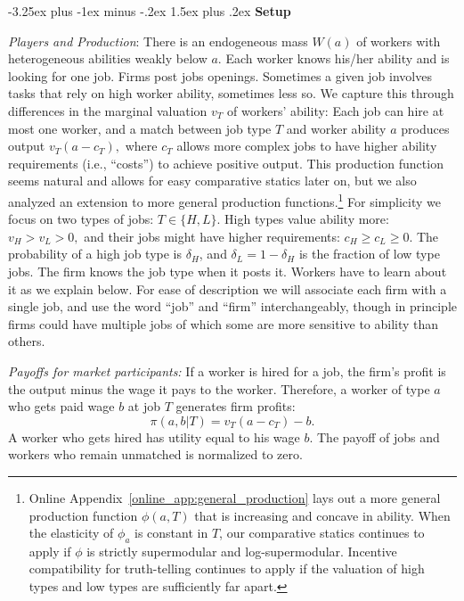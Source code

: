 \documentclass[12pt]{article}
\makeatletter
\renewcommand{\subsection}{%
  \@startsection{subsection}{2}{\z@}%
  {-3.25ex plus -1ex minus -.2ex}%
  {1.5ex plus .2ex}%
  {\normalfont\large\bfseries}%
}
\makeatother
\begin{document}
\subsection{\textbf{Setup}}\label{sec:setup}

\textit{Players and Production}: There is an endogeneous mass $W(a)$ of workers
with heterogeneous abilities weakly below $a$. Each worker knows his/her ability and is looking for one job. Firms post jobs openings. Sometimes a given job involves tasks that rely on high worker ability, sometimes less so. We capture this through differences in the marginal valuation $v_{T}$ of workers' ability: Each job can hire at most one
worker, and a match between job type $T$ and worker ability $a$ produces
output $v_{T}(a-c_{T}),$ where $c_{T}$ allows more complex jobs to have higher ability requirements (i.e., ``costs'') to achieve positive output. 
This production function seems natural and allows for easy comparative statics later on, but we also analyzed an extension to more general production functions.\footnote{Online Appendix~\ref{online_app:general_production} lays out a more general production function $\phi(a,T)$ that is increasing and concave in ability. When the elasticity of $\phi_a$ is constant in $T$, our comparative statics continues to apply if $\phi$ is strictly supermodular and log-supermodular. Incentive compatibility for truth-telling continues to apply if the valuation of high types and low types are sufficiently far apart.}
For simplicity we focus on two types of jobs: $T\in \{H,L\}.$ High types value
ability more: $v_{H}>v_{L}>0,$ and their jobs might have higher requirements: $%
c_{H}\geq c_{L}\geq 0$. The probability of a high job type is $\delta _{H}$, and $\delta_L = 1-\delta_H$ is the fraction of low type jobs. The firm knows the job type when it posts it. Workers have to learn about it as we explain below. For ease of description we will associate each firm with a single job, and use the word ``job'' and ``firm'' interchangeably, though in principle firms could have multiple jobs of which some are more sensitive to ability than others.


\textit{Payoffs for market participants:} If a worker is hired for a job, the firm's profit is the output
minus the wage it pays to the worker. Therefore, a worker of type $a$ who
gets paid wage $b$ at job $T$ generates firm profits:%
\begin{equation}
\pi (a,b|T)=v_{T}(a-c_{T})-b.  \label{firm-profit}
\end{equation}%
A worker who gets hired has utility equal to his wage $b$. The payoff of jobs
and workers who remain unmatched is normalized to zero.
\end{document}
